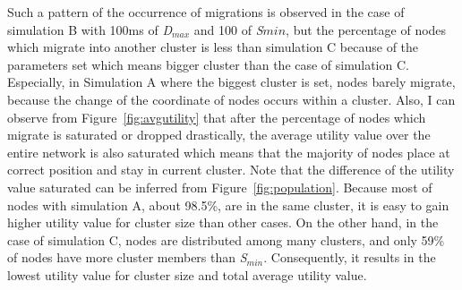 %
Such a pattern of the occurrence of migrations is observed in the case
of simulation B with 100ms of \textit{D$_{max}$} and 100 of
\textit{S${min}$}, but the percentage of nodes which migrate into
another cluster is less than simulation C because of the parameters set
which means bigger cluster than the case of simulation C.
%
Especially, in Simulation A where the biggest cluster is set, nodes
barely migrate, because the change of the coordinate of nodes occurs
within a cluster.
%
Also, I can observe from Figure~\ref{fig:avgutility} that after the
percentage of nodes which migrate is saturated or dropped drastically,
the average utility value over the entire network is also saturated
which means that the majority of nodes place at correct position and
stay in current cluster.
%
Note that the difference of the utility value saturated can be inferred
from Figure~\ref{fig:population}.
%
Because most of nodes with simulation A, about 98.5\%, are in the same
cluster, it is easy to gain higher utility value for cluster size than
other cases.
%
On the other hand, in the case of simulation C, nodes are distributed
among many clusters, and only 59\% of nodes have more cluster members
than \textit{S$_{min}$}.
%
Consequently, it results in the lowest utility value for cluster size
and total average utility value.
%

